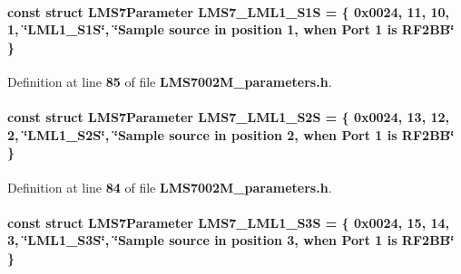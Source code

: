 \paragraph[{L\+M\+S7\+\_\+\+L\+M\+L1\+\_\+\+S1S}]{\setlength{\rightskip}{0pt plus 5cm}const struct {\bf L\+M\+S7\+Parameter} L\+M\+S7\+\_\+\+L\+M\+L1\+\_\+\+S1S = \{ 0x0024, 11, 10, 1, \char`\"{}\+L\+M\+L1\+\_\+\+S1\+S\char`\"{}, \char`\"{}\+Sample source in position 1, when Port 1 is R\+F2\+B\+B\char`\"{} \}\hspace{0.3cm}{\ttfamily [static]}}\label{LMS7002M__parameters_8h_ac2cdd31d67815c643f1b0064f66dc456}


Definition at line {\bf 85} of file {\bf L\+M\+S7002\+M\+\_\+parameters.\+h}.

\paragraph[{L\+M\+S7\+\_\+\+L\+M\+L1\+\_\+\+S2S}]{\setlength{\rightskip}{0pt plus 5cm}const struct {\bf L\+M\+S7\+Parameter} L\+M\+S7\+\_\+\+L\+M\+L1\+\_\+\+S2S = \{ 0x0024, 13, 12, 2, \char`\"{}\+L\+M\+L1\+\_\+\+S2\+S\char`\"{}, \char`\"{}\+Sample source in position 2, when Port 1 is R\+F2\+B\+B\char`\"{} \}\hspace{0.3cm}{\ttfamily [static]}}\label{LMS7002M__parameters_8h_aceccb44e7bf5b508532e9ac12fa32e56}


Definition at line {\bf 84} of file {\bf L\+M\+S7002\+M\+\_\+parameters.\+h}.

\paragraph[{L\+M\+S7\+\_\+\+L\+M\+L1\+\_\+\+S3S}]{\setlength{\rightskip}{0pt plus 5cm}const struct {\bf L\+M\+S7\+Parameter} L\+M\+S7\+\_\+\+L\+M\+L1\+\_\+\+S3S = \{ 0x0024, 15, 14, 3, \char`\"{}\+L\+M\+L1\+\_\+\+S3\+S\char`\"{}, \char`\"{}\+Sample source in position 3, when Port 1 is R\+F2\+B\+B\char`\"{} \}\hspace{0.3cm}{\ttfamily [static]}}\label{LMS7002M__parameters_8h_aedd0506481511454e96f24781235cbf9}


